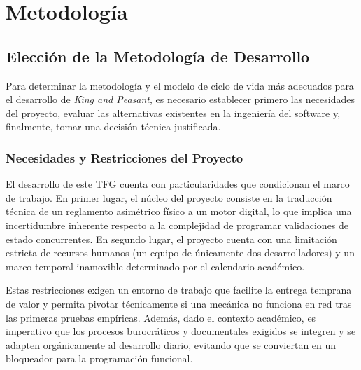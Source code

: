 \chapter{Metodología}

\begin{abstract}
En este capítulo se define el marco de trabajo y los procedimientos organizativos adoptados para la ejecución del proyecto. Se analiza la estructura del equipo de desarrollo y se realiza un estudio comparativo de distintas metodologías de ingeniería del software, justificando la elección de un enfoque iterativo frente a modelos tradicionales. Finalmente, se detalla la adaptación de dinámicas ágiles a un equipo reducido para garantizar la entrega continua de valor y la calidad del código.
\end{abstract}

\section{Elección de la Metodología de Desarrollo}

Para determinar la metodología y el modelo de ciclo de vida más adecuados para el desarrollo de \textit{King and Peasant}, es necesario establecer primero las necesidades del proyecto, evaluar las alternativas existentes en la ingeniería del software y, finalmente, tomar una decisión técnica justificada.

\subsection{Necesidades y Restricciones del Proyecto}
El desarrollo de este TFG cuenta con particularidades que condicionan el marco de trabajo. En primer lugar, el núcleo del proyecto consiste en la traducción técnica de un reglamento asimétrico físico a un motor digital, lo que implica una incertidumbre inherente respecto a la complejidad de programar validaciones de estado concurrentes. En segundo lugar, el proyecto cuenta con una limitación estricta de recursos humanos (un equipo de únicamente dos desarrolladores) y un marco temporal inamovible determinado por el calendario académico. 

Estas restricciones exigen un entorno de trabajo que facilite la entrega temprana de valor y permita pivotar técnicamente si una mecánica no funciona en red tras las primeras pruebas empíricas. Además, dado el contexto académico, es imperativo que los procesos burocráticos y documentales exigidos se integren y se adapten orgánicamente al desarrollo diario, evitando que se conviertan en un bloqueador para la programación funcional.

